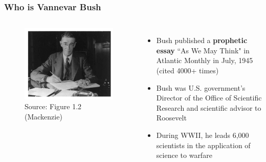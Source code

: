 \documentclass{beamer}
\begin{document}
\begin{frame}
\frametitle{Who is Vannevar Bush}

\begin{columns}[c] %
	
	\begin{figure}
			\includegraphics[width=1\linewidth]{bush}
			\caption{Source: Figure 1.2 (Mackenzie)}
	\end{figure}

	
	\begin{itemize}
		\item Bush published a \textbf{prophetic essay} ``As We May Think" in Atlantic Monthly in July, 1945 (cited 4000+ times)
		\item Bush was U.S. government's Director of the Office of Scientific Research and scientific advisor to Roosevelt
		\item During WWII, he leads 6,000 scientists in the application of science to warfare
	\end{itemize}
	
\end{columns}
\end{frame}
\end{document}
